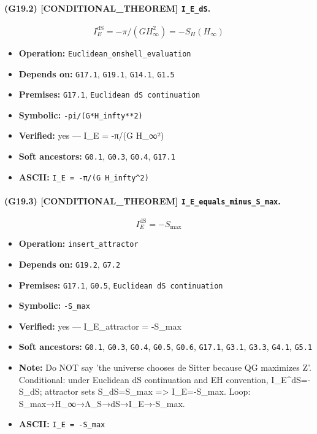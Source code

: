 \documentclass[11pt,a4paper]{article}
\theoremstyle{remark}\newtheorem*{caution}{Caution}
\newcommand{\tagbox}[1]{\textsc{[#1]}}
\begin{document}
\paragraph{(G19.2) \tagbox{CONDITIONAL\_THEOREM} \texttt{I\_E\_dS}.}
\begin{equation}
I_E^{\mathrm{dS}}=-\pi/(G H_\infty^2)=-S_H(H_\infty)
\tag{G19.2}
\end{equation}
\begin{itemize}\setlength{\itemsep}{0.12em}
\item \textbf{Operation:} \texttt{Euclidean\_onshell\_evaluation}
\item \textbf{Depends on:} \texttt{G17.1}, \texttt{G19.1}, \texttt{G14.1}, \texttt{G1.5}
\item \textbf{Premises:} \texttt{G17.1}, \texttt{Euclidean dS continuation}
\item \textbf{Symbolic:} \texttt{-pi/(G*H\_infty**2)}
\item \textbf{Verified:} yes --- I\_E = -π/(G H\_∞²)
\item \textbf{Soft ancestors:} \texttt{G0.1}, \texttt{G0.3}, \texttt{G0.4}, \texttt{G17.1}
\item \textbf{ASCII:} \texttt{I\_E = -π/(G H\_infty^2)}
\end{itemize}
\paragraph{(G19.3) \tagbox{CONDITIONAL\_THEOREM} \texttt{I\_E\_equals\_minus\_S\_max}.}
\begin{equation}
I_E^{\mathrm{dS}}=-S_{\max}
\tag{G19.3}
\end{equation}
\begin{itemize}\setlength{\itemsep}{0.12em}
\item \textbf{Operation:} \texttt{insert\_attractor}
\item \textbf{Depends on:} \texttt{G19.2}, \texttt{G7.2}
\item \textbf{Premises:} \texttt{G17.1}, \texttt{G0.5}, \texttt{Euclidean dS continuation}
\item \textbf{Symbolic:} \texttt{-S\_max}
\item \textbf{Verified:} yes --- I\_E\_attractor = -S\_max
\item \textbf{Soft ancestors:} \texttt{G0.1}, \texttt{G0.3}, \texttt{G0.4}, \texttt{G0.5}, \texttt{G0.6}, \texttt{G17.1}, \texttt{G3.1}, \texttt{G3.3}, \texttt{G4.1}, \texttt{G5.1}
\item \textbf{Note:} Do NOT say 'the universe chooses de Sitter because QG maximizes Z'. Conditional: under Euclidean dS continuation and EH convention, I\_E^{dS}=-S\_dS; attractor sets S\_dS=S\_max => I\_E=-S\_max. Loop: S\_max→H\_∞→Λ\_S→dS→I\_E→-S\_max.
\item \textbf{ASCII:} \texttt{I\_E = -S\_max}
\end{itemize}
\end{document}
